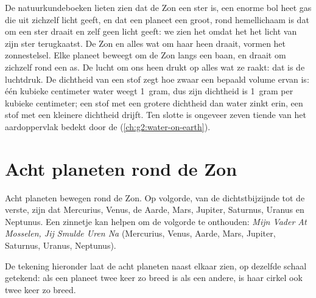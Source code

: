 \begin{recall}
De natuurkundeboeken lieten zien dat de Zon een ster is, een enorme bol
heet gas die uit zichzelf licht geeft, en dat een planeet een groot, rond
hemellichaam is dat om een ster draait en zelf geen licht geeft: we zien
het omdat het het licht van zijn ster terugkaatst. De Zon en alles wat om
haar heen draait, vormen het zonnestelsel. Elke planeet beweegt om de Zon
langs een baan, en draait om zichzelf rond een as. De lucht om ons heen
drukt op alles wat ze raakt: dat is de luchtdruk. De dichtheid van een
stof zegt hoe zwaar een bepaald volume ervan is: één kubieke centimeter
water weegt 1~gram, dus zijn dichtheid is 1~gram per kubieke centimeter;
een stof met een grotere dichtheid dan water zinkt erin, een stof met een
kleinere dichtheid drijft. Ten slotte is ongeveer zeven tiende van het
aardoppervlak bedekt door de  (\cref{ch:g2:water-on-earth}).
\end{recall}

\section{Acht planeten rond de Zon}

Acht planeten bewegen rond de Zon. Op volgorde, van de dichtstbijzijnde
tot de verste, zijn dat Mercurius, Venus, de Aarde, Mars, Jupiter,
Saturnus, Uranus en Neptunus. Een zinnetje kan helpen om de volgorde te
onthouden: \emph{Mijn Vader At Mosselen, Jij Smulde Uren Na} (Mercurius,
Venus, Aarde, Mars, Jupiter, Saturnus, Uranus, Neptunus).

De tekening hieronder laat de acht planeten naast elkaar zien, op dezelfde
schaal getekend: als een planeet twee keer zo breed is als een andere, is
haar cirkel ook twee keer zo breed.

